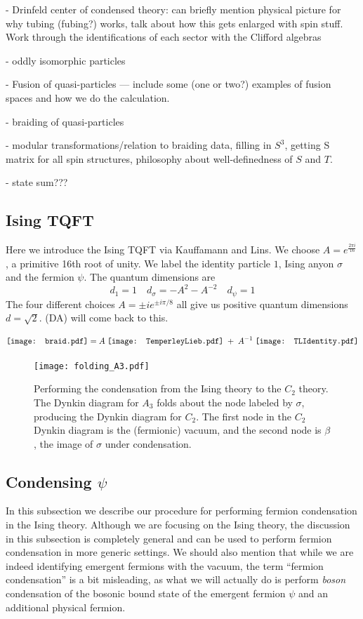 \documentclass[12pt,a4paper]{article}
\newcommand\be            {\begin{equation}}
\newcommand\ee            {\end{equation}}
\newcommand{\dave}[1]{{\color{ao(english)}\footnotesize{(DA) #1}}}
\begin{document}
- Drinfeld center of condensed theory: can briefly mention physical picture for why tubing (fubing?) works, talk about how this gets enlarged with spin stuff. Work through the identifications of each sector with the Clifford algebras 

- oddly isomorphic particles

- Fusion of quasi-particles --- include some (one or two?) examples of fusion spaces and how we do the calculation. 

- braiding of quasi-particles 

- modular transformations/relation to braiding data, filling in $S^3$, getting S matrix for all spin structures, philosophy about well-definedness of $S$ and $T$. 

- state sum???


\subsection{Ising TQFT}
Here we introduce the Ising TQFT via Kauffamann and Lins\cite{Lins1994}. We choose $A = e^{\frac{2 \pi i}{16}}$, a primitive 16th root of unity. 
We label the identity particle $1$, Ising anyon $\sigma$ and the fermion $\psi$.
The quantum dimensions are
\be
d_1 = 1 \quad d_\sigma = -A^2 - A^{-2} \quad d_\psi =1 
\ee
The four different choices $A = \pm ie^{\pm i\pi/8}$ all give us positive quantum dimensions $d = \sqrt{2}$. 
\dave{will come back to this.}

\newcommand{\braid}{\mathord{\vcenter{\hbox{\texttt{[image: braid.pdf]}}}}}
\newcommand{\TLIdentity}{\mathord{\vcenter{\hbox{\texttt{[image: TLIdentity.pdf]}}}}}
\newcommand{\TemperleyLieb}{\mathord{\vcenter{\hbox{\texttt{[image: TemperleyLieb.pdf]}}}}}
  
\begin{align}
\braid = A\;  \TemperleyLieb \; +\;  A^{-1}\;  \TLIdentity
\end{align}

\begin{figure}
\texttt{[image: folding\_A3.pdf]}
\caption{Performing the condensation from the Ising theory to the $C_2$ theory. The Dynkin diagram for $A_3$ folds about the node labeled by $\sigma$, producing the Dynkin diagram 
for $C_2$. The first node in the $C_2$ Dynkin diagram is the (fermionic) vacuum, and the second node is $\beta$, the image of $\sigma$ under condensation.} 
\end{figure}


\subsection{Condensing $\psi$} \label{condensing_psi}
In this subsection we describe our procedure for performing fermion condensation in the Ising theory. Although we are focusing on the Ising theory, the discussion in this subsection is completely general and can be used to perform fermion condensation in more generic settings. We should also mention that while we are indeed identifying emergent fermions with the vacuum, the term ``fermion condensation'' is a bit misleading, as what we will actually do is perform {\it boson} condensation of the bosonic bound state of the emergent fermion $\psi$ and an additional physical fermion. 
\end{document}
